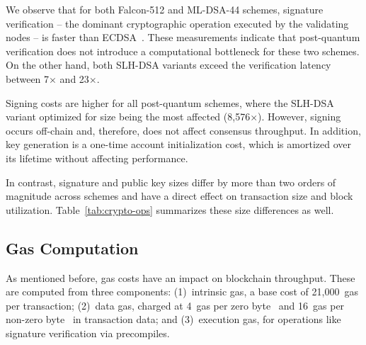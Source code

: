 We observe that for both Falcon-512 and ML-DSA-44 schemes, signature verification -- the dominant cryptographic operation executed by the validating nodes -- is faster than ECDSA~\cite{ESORICS:KARR25}.
These measurements indicate that post-quantum verification does not introduce a computational bottleneck for these two schemes.
On the other hand, both SLH-DSA variants exceed the verification latency between 7$\times$  and 23$\times$.

Signing costs are higher for all post-quantum schemes, where the SLH-DSA variant optimized for size being the most affected (8{,}576$\times$).
However, signing occurs off-chain and, therefore, does not affect consensus throughput.
In addition, key generation is a one-time account initialization cost, which is amortized over its lifetime without affecting performance.

In contrast, signature and public key sizes differ by more than two orders of magnitude across schemes and have a direct effect on transaction size and block utilization.
Table~\ref{tab:crypto-ops} summarizes these size differences as well.

\subsection{Gas Computation}

As mentioned before, gas costs have an impact on blockchain throughput. 
These are computed from three components: (1)~intrinsic gas, a base cost of 21,000~gas per transaction; (2)~data gas, charged at 4~gas per zero byte~\cite{ETH:W14} and 16~gas per non-zero byte~\cite{EIP2028} in transaction data; and (3)~execution gas, for operations like signature verification via precompiles.

